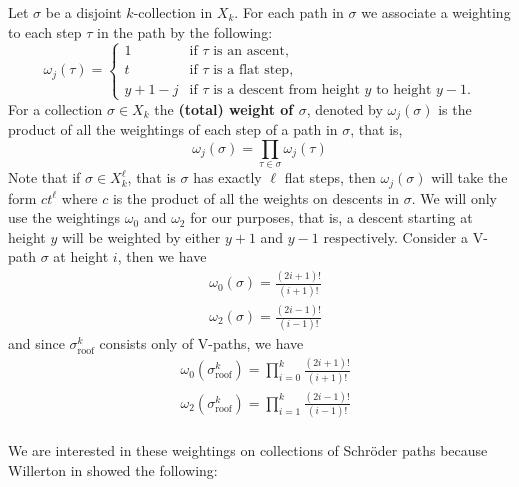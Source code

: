 \documentclass[11pt]{article}
\theoremstyle{mythm}
\begin{document}
Let $\sigma$ be a disjoint $k$-collection in $X_k$. For each path in $\sigma$ we associate a weighting to each step $\tau$ in the path by the following:
\begin{equation*}
\omega_j(\tau) = \begin{cases} 
1 &\text{if $\tau$ is an ascent,} \\
t &\text{if $\tau$ is a flat step,} \\
y+1-j &\text{if $\tau$ is a descent from height $y$ to height $y-1$.}
\end{cases}
\end{equation*}
For a collection $\sigma\in X_k$ the \textbf{(total) weight of $\sigma$}, denoted by $\omega_j(\sigma)$ is the product of all the weightings of each step of a path in $\sigma$, that is,
\begin{equation*}
\omega_j(\sigma) = \prod\limits_{\tau\in\sigma}\omega_j(\tau)
\end{equation*}
Note that if $\sigma \in X_k^\ell$, that is $\sigma$ has exactly $\ell$ flat steps, then $\omega_j(\sigma)$ will take the form $ct^\ell$ where $c$ is the product of all the weights on descents in $\sigma$. We will only use the weightings $\omega_0$ and $\omega_2$ for our purposes, that is, a descent starting at height $y$ will be weighted by either $y+1$ and $y-1$ respectively. Consider a V-path $\sigma$ at height $i$, then we have
\begin{align*}
&\omega_0(\sigma) = \frac{(2i+1)!}{(i+1)!} \\
&\omega_2(\sigma) = \frac{(2i-1)!}{(i-1)!}
\end{align*}
and since $\sigma_{\text{roof}}^k$ consists only of V-paths, we have
\begin{align*}
&\omega_0\left(\sigma_{\text{roof}}^k\right) = \prod\limits_{i=0}^k\frac{(2i+1)!}{(i+1)!} \\
&\omega_2\left(\sigma_{\text{roof}}^k\right) = \prod\limits_{i=1}^k\frac{(2i-1)!}{(i-1)!} \\
\end{align*}

We are interested in these weightings on collections of Schröder paths because Willerton in \cite{willerton_magnitude_2017} showed the following:
\end{document}
